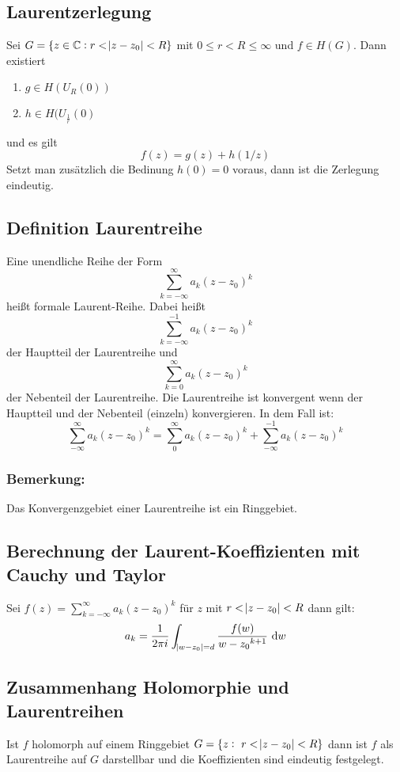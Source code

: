 \subsection{Laurentzerlegung}
Sei $G = \{z \in \mathbb{C}: r<\abs{z-z_0} < R\}$ mit $0 \leq r < R \leq \infty$ und $f\in H(G)$. Dann existiert
\begin{enumerate}
    \item $g \in H(U_R(0))$
    \item $h \in H(U_{\frac{1}{r}} (0)$
\end{enumerate}
und es gilt
\begin{equation*}
    f(z) = g(z) + h(1/z)
\end{equation*}
Setzt man zusätzlich die Bedinung $h(0) = 0$ voraus, dann ist die Zerlegung eindeutig.

\subsection{Definition Laurentreihe}
Eine unendliche Reihe der Form
\begin{equation*}
    \sum_{k=-\infty}^\infty a_k {(z-z_0)}^k
\end{equation*}
heißt formale Laurent-Reihe. Dabei heißt
\begin{equation*}
    \sum_{k=-\infty}^{-1} a_k {(z-z_0)}^k
\end{equation*}
der Hauptteil der Laurentreihe und
\begin{equation*}
    \sum_{k=0}^\infty a_k {(z-z_0)}^k
\end{equation*}
der Nebenteil der Laurentreihe. Die Laurentreihe ist konvergent wenn der Hauptteil und der Nebenteil (einzeln)
konvergieren. In dem Fall ist:
\begin{equation*}
    \sum_{-\infty}^\infty a_k {(z-z_0)}^k = \sum_{0}^\infty a_k {(z-z_0)}^k + 
        \sum_{-\infty}^{-1} a_k {(z-z_0)}^k
\end{equation*}

\subsubsection{Bemerkung:}
Das Konvergenzgebiet einer Laurentreihe ist ein Ringgebiet.

\subsection{Berechnung der Laurent-Koeffizienten mit Cauchy und Taylor}
Sei $f(z) = \sum_{k=-\infty}^\infty a_k {(z-z_0)}^k$ für $z$ mit $r < \abs{z-z_0} < R$ dann gilt:
\begin{equation*}
    a_k = \frac{1}{2 \pi i} \int_{\abs{w-z_0} = d} \frac{f(w)}{{w-z_0}^{k+1}} \text{ d}w
\end{equation*}

\subsection{Zusammenhang Holomorphie und Laurentreihen}
Ist $f$ holomorph auf einem Ringgebiet $G = \{z:\ r < \abs{z-z_0} < R\}$ dann ist $f$ als Laurentreihe auf $G$
darstellbar und die Koeffizienten sind eindeutig festgelegt.




